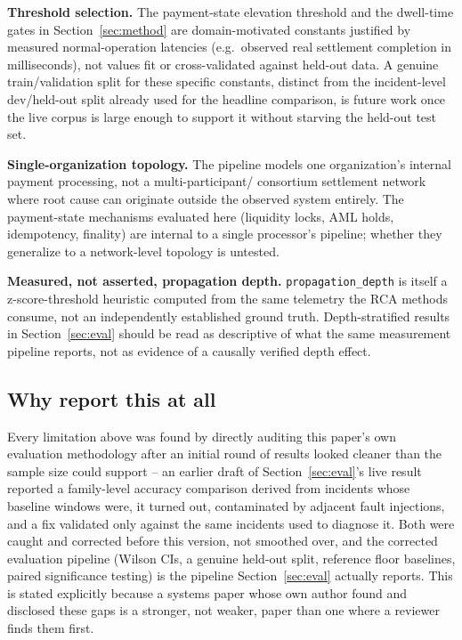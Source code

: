 \documentclass[conference]{IEEEtran}
\begin{document}
\textbf{Threshold selection.} The payment-state elevation threshold and the
dwell-time gates in Section~\ref{sec:method} are domain-motivated constants
justified by measured normal-operation latencies (e.g.\ observed real
settlement completion in milliseconds), not values fit or cross-validated
against held-out data. A genuine train/validation split for these specific
constants, distinct from the incident-level dev/held-out split already used
for the headline comparison, is future work once the live corpus is large
enough to support it without starving the held-out test set.

\textbf{Single-organization topology.} The pipeline models one
organization's internal payment processing, not a multi-participant/
consortium settlement network where root cause can originate outside the
observed system entirely. The payment-state mechanisms evaluated here
(liquidity locks, AML holds, idempotency, finality) are internal to a single
processor's pipeline; whether they generalize to a network-level topology
is untested.

\textbf{Measured, not asserted, propagation depth.} \texttt{propagation\_depth}
is itself a z-score-threshold heuristic computed from the same telemetry
the RCA methods consume, not an independently established ground truth.
Depth-stratified results in Section~\ref{sec:eval} should be read as
descriptive of what the same measurement pipeline reports, not as evidence
of a causally verified depth effect.

\subsection{Why report this at all}
\label{sec:whyreport}
Every limitation above was found by directly auditing this paper's own
evaluation methodology after an initial round of results looked cleaner
than the sample size could support -- an earlier draft of
Section~\ref{sec:eval}'s live result reported a family-level accuracy
comparison derived from incidents whose baseline windows were, it turned
out, contaminated by adjacent fault injections, and a fix validated only
against the same incidents used to diagnose it. Both were caught and
corrected before this version, not smoothed over, and the corrected
evaluation pipeline (Wilson CIs, a genuine held-out split, reference floor
baselines, paired significance testing) is the pipeline
Section~\ref{sec:eval} actually reports. This is stated explicitly because
a systems paper whose own author found and disclosed these gaps is a
stronger, not weaker, paper than one where a reviewer finds them first.
\end{document}
